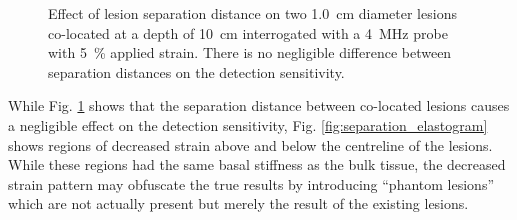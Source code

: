 			\begin{figure}[!htb]
				\centering
				\caption[Quasi-static lesion separation distance characterization]{Effect of lesion separation distance on two \SI{1.0}{\cm} diameter lesions co-located at a depth of \SI{10}{\cm} interrogated with a \SI{4}{\MHz} probe with \SI{5}{\percent} applied strain. There is no negligible difference between separation distances on the detection sensitivity.}
				\label{fig:separation_characterization}
			\end{figure}

			While Fig. \ref{fig:separation_characterization} shows that the separation distance between co-located lesions causes a negligible effect on the detection sensitivity, Fig. \ref{fig:separation_elastogram} shows regions of decreased strain above and below the centreline of the lesions. While these regions had the same basal stiffness as the bulk tissue, the decreased strain pattern may obfuscate the true results by introducing ``phantom lesions'' which are not actually present but merely the result of the existing lesions.

